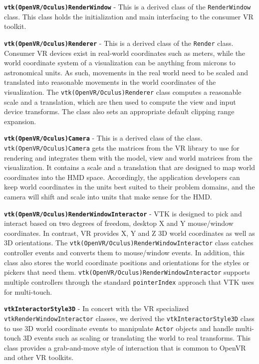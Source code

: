 \textbf{\texttt{vtk(OpenVR/Oculus)RenderWindow}} - This is a derived class of the \texttt{RenderWindow} class.
This class holds the initialization and main interfacing to the consumer VR toolkit. 

\textbf{\texttt{vtk(OpenVR/Oculus)Renderer}} - This is a derived class of the \texttt{Render} class.
Consumer VR devices exist in real-world coordinates such as meters, while the world coordinate system of a visualization can be anything from microns to astronomical units. As such, movements in the real world need to be scaled and translated into reasonable movements in the world coordinates of the visualization. The \texttt{vtk(OpenVR/Oculus)Renderer} class computes a reasonable scale and a translation, which are then used to compute the view and input device transforms. 
The class also sets an appropriate default clipping range expansion.

\textbf{\texttt{vtk(OpenVR/Oculus)Camera}} - This is a derived class of the  class. \texttt{vtk(OpenVR/Oculus)Camera} gets the matrices from the VR library to use for rendering and integrates them with the model, view and world matrices from the visualization. It contains a scale and a translation that are designed to map world coordinates into the HMD space.
Accordingly, the application developers can keep world coordinates in the units best suited to their problem domains, and the camera will shift and scale into units that make sense for the HMD.

\textbf{\texttt{vtk(OpenVR/Oculus)RenderWindowInteractor}} - VTK is designed to pick and interact based on two degrees of freedom, desktop X and Y mouse/window coordinates.
In contrast, VR provides X, Y and Z 3D world coordinates as well as 3D orientations.
The \texttt{vtk(OpenVR/Oculus)RenderWindowInteractor} class catches controller events and converts them to mouse/window events.
In addition, this class also stores the world coordinate positions and orientations for the styles or pickers that need them.
\texttt{vtk(OpenVR/Oculus)RenderWindowInteractor} supports multiple controllers through the standard \texttt{pointerIndex} approach that VTK uses for multi-touch.

\textbf{\texttt{vtkInteractorStyle3D}} - In concert with the VR specialized \texttt{vtkRenderWindowInteractor} classes, we derived the \texttt{vtkInteractorStyle3D} class
to use 3D world coordinate events to manipulate \texttt{Actor} objects and handle multi-touch 3D events such as scaling or translating the world to real transforms.
This class provides a grab-and-move style of interaction that is common to OpenVR and other VR toolkits.


